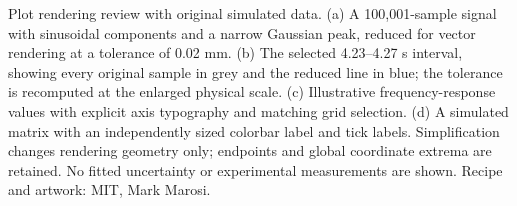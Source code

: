 \caption{Plot rendering review with original simulated data. (a) A 100,001-sample signal with sinusoidal components and a narrow Gaussian peak, reduced for vector rendering at a tolerance of 0.02 mm. (b) The selected 4.23--4.27 s interval, showing every original sample in grey and the reduced line in blue; the tolerance is recomputed at the enlarged physical scale. (c) Illustrative frequency-response values with explicit axis typography and matching grid selection. (d) A simulated matrix with an independently sized colorbar label and tick labels. Simplification changes rendering geometry only; endpoints and global coordinate extrema are retained. No fitted uncertainty or experimental measurements are shown. Recipe and artwork: MIT, Mark Marosi.}
